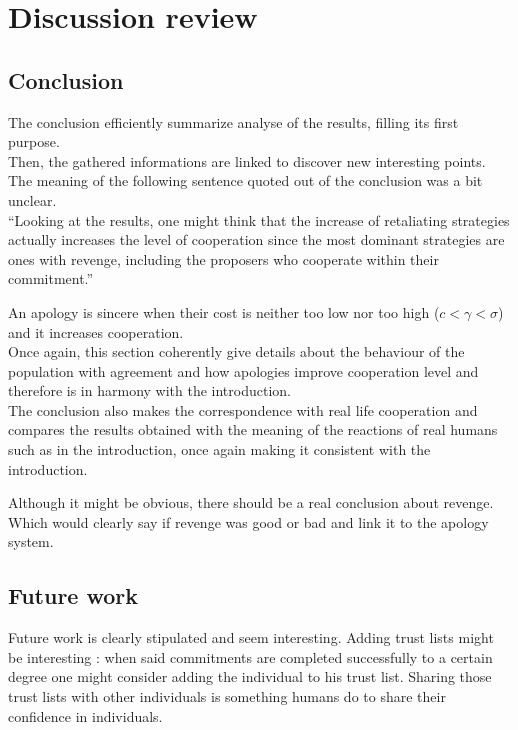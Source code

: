 \documentclass{article}
\begin{document}
\section{Discussion review}

\subsection{Conclusion}

The conclusion efficiently summarize analyse of the results, filling its first purpose.\\

Then, the gathered informations are linked to discover new interesting points.\\
The meaning of the following sentence quoted out of the conclusion was a bit unclear.\\
``Looking at the results, one might think that the increase of retaliating strategies actually increases the level of cooperation since the most dominant strategies are ones with revenge, including the proposers who cooperate within their commitment.''

An apology is sincere when their cost is neither too low nor too high ($c<\gamma<\sigma$) and it increases cooperation.\\

Once again, this section coherently give details about the behaviour of the population with agreement and how apologies improve cooperation level and therefore is in harmony with the introduction.\\

The conclusion also makes the correspondence with real life cooperation and compares the results obtained with the meaning of the reactions of real humans such as in the introduction, once again making it consistent with the introduction.

Although it might be obvious, there should be a real conclusion about revenge. Which would clearly say if revenge was good or bad and link it to the apology system.


\subsection{Future work}

Future work is clearly stipulated and seem interesting. Adding trust lists might be interesting : when said commitments are completed successfully to a certain degree one might consider adding the individual to his trust list. Sharing those trust lists with other individuals is something humans do to share their confidence in individuals.
\end{document}

